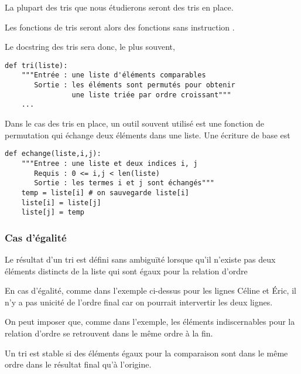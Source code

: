 La plupart des tris que nous étudierons seront des tris en place.

Les fonctions de tris seront alors des fonctions sans instruction .

\medskip

Le docstring des tris sera donc, le plus souvent,
\begin{lstlisting}
def tri(liste):
    """Entrée : une liste d'éléments comparables
       Sortie : les éléments sont permutés pour obtenir
                une liste triée par ordre croissant"""
    ...
\end{lstlisting}
Dans le cas des tris en place, un outil souvent utilisé est une fonction de permutation qui échange deux éléments dans une liste. Une écriture de base est 
\begin{lstlisting}
def echange(liste,i,j):
    """Entree : une liste et deux indices i, j 
       Requis : 0 <= i,j < len(liste)
       Sortie : les termes i et j sont échangés"""
    temp = liste[i] # on sauvegarde liste[i]
    liste[i] = liste[j]
    liste[j] = temp
\end{lstlisting}

\subsubsection{Cas d'égalité}
Le résultat d'un tri est défini sans ambiguïté lorsque qu'il n'existe pas deux éléments distincts de la liste qui sont égaux pour la relation d'ordre

En cas d'égalité, comme dans l'exemple ci-dessus pour les lignes Céline et Éric,  il n'y a pas unicité de l'ordre final car on pourrait intervertir les deux lignes. 

On peut imposer que, comme dans l'exemple, les éléments indiscernables pour la relation d'ordre se retrouvent dans le même ordre à la fin.
\begin{defin}
Un tri est stable si des éléments égaux pour la comparaison sont dans le même ordre dans le résultat final qu'à l'origine.
\end{defin}
